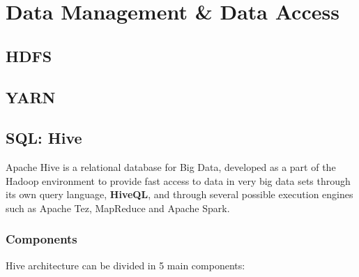 \chapter{Data Management \& Data Access}

\section{HDFS}

\section{YARN}

\section{SQL: Hive}

Apache Hive is a relational database for Big Data, developed as a part of the Hadoop environment to provide fast access to data in very big data sets through its own
query language, \textbf{HiveQL}, and through several possible execution engines such as Apache Tez, MapReduce and Apache Spark.

\subsection{Components}

Hive architecture can be divided in 5 main components:

